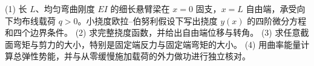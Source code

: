 (1) 长 \(L\)、均匀弯曲刚度 \(EI\) 的细长悬臂梁在 \(x=0\) 固支，\(x=L\) 自由端，承受向下均布线载荷 \(q>0\)。小挠度欧拉–伯努利假设下写出挠度 \(y(x)\) 的四阶微分方程和四个边界条件。
(2) 求完整挠度函数，并给出自由端位移与转角。
(3) 求任意截面弯矩与剪力的大小，特别是固定端反力与固定端弯矩的大小。
(4) 用曲率能量计算总弹性势能，并与从零缓慢施加载荷的外力做功进行独立核对。
